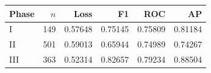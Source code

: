 \begin{tabular}{lrrrrr}
\toprule
Phase & $n$ & Loss & F1 & ROC & AP \\
\midrule
I & 149 & 0.57648 & 0.75145 & 0.75809 & 0.81184 \\
II & 501 & 0.59013 & 0.65944 & 0.74989 & 0.74267 \\
III & 363 & 0.52314 & 0.82657 & 0.79234 & 0.88504 \\
\bottomrule
\end{tabular}
